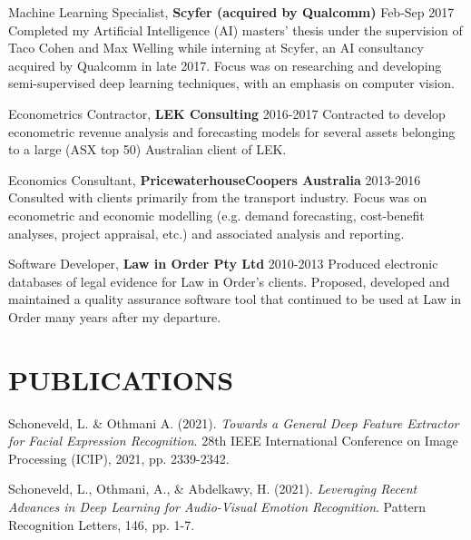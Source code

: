 \documentclass[margin]{res}
\begin{document}
\begin{resume}
		{Machine Learning Specialist,} {\bf Scyfer (acquired by Qualcomm)} \hfill Feb-Sep 2017\vspace{1mm}\newline
		Completed my Artificial Intelligence (AI) masters' thesis under the supervision of Taco Cohen and Max Welling while interning at Scyfer, an AI consultancy acquired by Qualcomm in late 2017. Focus was on researching and developing semi-supervised deep learning techniques, with an emphasis on computer vision.
		
		{Econometrics Contractor,} {\bf LEK Consulting} \hfill 2016-2017\vspace{1mm}\newline
		Contracted to develop econometric revenue analysis and forecasting models for several assets belonging to a large (ASX top 50) Australian client of LEK.
		
		{Economics Consultant,} {\bf PricewaterhouseCoopers Australia} \hfill 2013-2016\vspace{1mm}\newline
		Consulted with clients primarily from the transport industry. Focus was on econometric and economic modelling (e.g. demand forecasting, cost-benefit analyses, project appraisal, etc.) and associated analysis and reporting.
		
		{Software Developer,} {\bf Law in Order Pty Ltd} \hfill 2010-2013\vspace{1mm}\newline
		Produced electronic databases of legal evidence for Law in Order's clients. Proposed, developed and maintained a quality assurance software tool that continued to be used at Law in Order many years after my departure.		
		
		\section{PUBLICATIONS}
		
		Schoneveld, L. \& Othmani A. (2021).
		\textit{Towards a General Deep Feature Extractor for Facial Expression Recognition}. 28th IEEE International Conference on Image Processing (ICIP), 2021, pp. 2339-2342.
		
		Schoneveld, L., Othmani, A., \& Abdelkawy, H. (2021). \textit{Leveraging Recent Advances in Deep Learning for Audio-Visual Emotion Recognition}. Pattern Recognition Letters, 146, pp. 1-7.
		

\end{resume}
\end{document}
